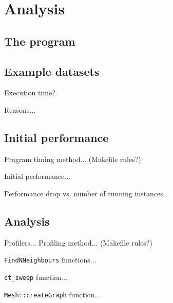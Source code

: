 \documentclass[conference]{IEEEtran}
\begin{document}
\cite{malladi2009using}

\section{Analysis}

\subsection{The program}

\subsection{Example datasets}

Execution time?

Reasons...

\subsection{Initial performance}

Program timing method... (Makefile rules?)

Initial performance...

Performance drop vs. number of running instances...

\subsection{Analysis}

Profilers... Profiling method... (Makefile rules?)

\texttt{FindNNeighbours} functions...

\texttt{ct\_sweep} function...

\texttt{Mesh::createGraph} function...
\end{document}

